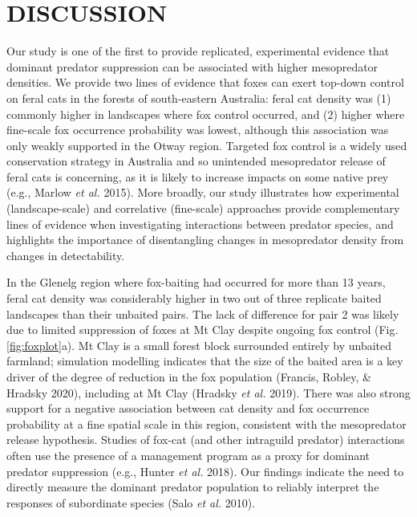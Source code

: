 \documentclass[preprint, 3p, authoryear]{elsarticle} %
\begin{document}
\newpage

\hypertarget{discussion}{%
\section{DISCUSSION}\label{discussion}}

Our study is one of the first to provide replicated, experimental evidence that dominant predator suppression can be associated with higher mesopredator densities. We provide two lines of evidence that foxes can exert top-down control on feral cats in the forests of south-eastern Australia: feral cat density was (1) commonly higher in landscapes where fox control occurred, and (2) higher where fine-scale fox occurrence probability was lowest, although this association was only weakly supported in the Otway region. Targeted fox control is a widely used conservation strategy in Australia and so unintended mesopredator release of feral cats is concerning, as it is likely to increase impacts on some native prey (e.g., Marlow \emph{et al.} 2015). More broadly, our study illustrates how experimental (landscape-scale) and correlative (fine-scale) approaches provide complementary lines of evidence when investigating interactions between predator species, and highlights the importance of disentangling changes in mesopredator density from changes in detectability.

In the Glenelg region where fox-baiting had occurred for more than 13 years, feral cat density was considerably higher in two out of three replicate baited landscapes than their unbaited pairs. The lack of difference for pair 2 was likely due to limited suppression of foxes at Mt Clay despite ongoing fox control (Fig. \ref{fig:foxplot}a). Mt Clay is a small forest block surrounded entirely by unbaited farmland; simulation modelling indicates that the size of the baited area is a key driver of the degree of reduction in the fox population (Francis, Robley, \& Hradsky 2020), including at Mt Clay (Hradsky \emph{et al.} 2019). There was also strong support for a negative association between cat density and fox occurrence probability at a fine spatial scale in this region, consistent with the mesopredator release hypothesis. Studies of fox-cat (and other intraguild predator) interactions often use the presence of a management program as a proxy for dominant predator suppression (e.g., Hunter \emph{et al.} 2018). Our findings indicate the need to directly measure the dominant predator population to reliably interpret the responses of subordinate species (Salo \emph{et al.} 2010).
\end{document}
